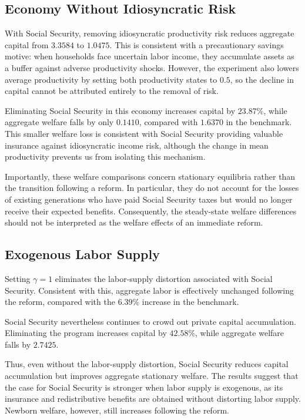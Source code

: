\documentclass{article}
\begin{document}
\subsection*{Economy Without Idiosyncratic Risk}

With Social Security, removing idiosyncratic productivity risk
reduces aggregate capital from $3.3584$ to $1.0475$. This is
consistent with a precautionary savings motive: when households
face uncertain labor income, they accumulate assets as a buffer
against adverse productivity shocks. However, the experiment
also lowers average productivity by setting both productivity
states to $0.5$, so the decline in capital cannot be attributed
entirely to the removal of risk.

Eliminating Social Security in this economy increases capital
by $23.87\%$, while aggregate welfare falls by only $0.1410$,
compared with $1.6370$ in the benchmark. This smaller welfare
loss is consistent with Social Security providing valuable
insurance against idiosyncratic income risk, although the
change in mean productivity prevents us from isolating this
mechanism.

Importantly, these welfare comparisons concern stationary
equilibria rather than the transition following a reform.
In particular, they do not account for the losses of existing
generations who have paid Social Security taxes but would
no longer receive their expected benefits. Consequently,
the steady-state welfare differences should not be interpreted
as the welfare effects of an immediate reform.

\subsection*{Exogenous Labor Supply}

Setting $\gamma=1$ eliminates the labor-supply distortion
associated with Social Security. Consistent with this,
aggregate labor is effectively unchanged following the
reform, compared with the $6.39\%$ increase in the benchmark.

Social Security nevertheless continues to crowd out private
capital accumulation. Eliminating the program increases
capital by $42.58\%$, while aggregate welfare falls by
$2.7425$.

Thus, even without the labor-supply distortion, Social
Security reduces capital accumulation but improves aggregate
stationary welfare. The results suggest that the case for
Social Security is stronger when labor supply is exogenous,
as its insurance and redistributive benefits are obtained
without distorting labor supply. Newborn welfare, however,
still increases following the reform.
\end{document}
